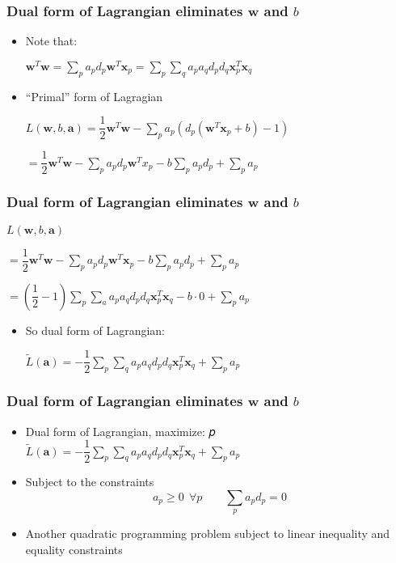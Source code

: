 \documentclass[12pt,notes,mathserif]{beamer}
\begin{document}
\begin{frame}[c]
\frametitle{Dual form of Lagrangian eliminates $\bm{w}$ and $b$}
\begin{itemize}
\item Note that:

$\bm{w}^T\bm{w}=\sum\limits_pa_pd_p\bm{w}^T\bm{x}_p=\sum\limits_p\sum\limits_qa_pa_qd_pd_q\bm{x}_p^T\bm{x}_q$
\item ``Primal'' form of Lagragian

$L(\bm{w},b,\bm{a})=\dfrac{1}{2}\bm{w}^T\bm{w}-\sum\limits_pa_p(d_p(\bm{w}^T\bm{x}_p+b)-1)$

$=\dfrac{1}{2}\bm{w}^T\bm{w}-\sum\limits_pa_pd_p\bm{w}^Tx_p-b\sum\limits_pa_pd_p+\sum\limits_pa_p$
\end{itemize}

\end{frame}

\begin{frame}[c]
\frametitle{Dual form of Lagrangian eliminates $\bm{w}$ and $b$}
$L(\bm{w},b,\bm{a})$

$=\dfrac{1}{2}\bm{w}^T\bm{w}-\sum\limits_pa_pd_p\bm{w}^T\bm{x}_p-b\sum\limits_pa_pd_p+\sum\limits_pa_p$

$=\left(\dfrac{1}{2}-1\right)\sum\limits_p\sum\limits_aa_pa_qd_pd_q\bm{x}_p^T\bm{x}_q-b\cdot 0+\sum\limits_pa_p$
\begin{itemize}
\item So dual form of Lagrangian:

$\tilde{L}(\bm{a})=-\dfrac{1}{2}\sum\limits_p\sum\limits_qa_pa_qd_pd_q\bm{x}_p^T\bm{x}_q+\sum\limits_pa_p$
\end{itemize}

\end{frame}

\begin{frame}[c]
\frametitle{Dual form of Lagrangian eliminates $\bm{w}$ and $b$}
\begin{itemize}
\item Dual form of Lagrangian, maximize:
𝑝
$\tilde{L}(\bm{a})=-\dfrac{1}{2}\sum\limits_p\sum\limits_qa_pa_qd_pd_q\bm{x}_p^T\bm{x}_q+\sum\limits_pa_p$
\item Subject to the constraints
\[
a_p\geqslant{}0~~\forall p\qquad \sum_p a_pd_p=0
\]
\item Another quadratic programming problem subject to linear inequality and equality constraints
\end{itemize}
\end{frame}
\end{document}

